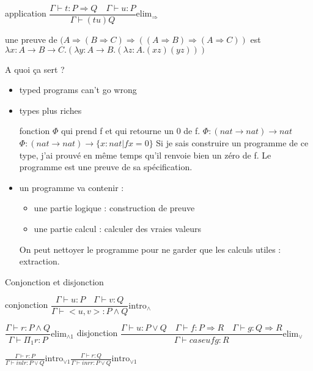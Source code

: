 \documentclass[10pt,a4paper]{article}
\begin{document}
application $\dfrac{\Gamma \vdash t : P \Rightarrow Q \quad \Gamma \vdash u:P}{\Gamma \vdash (t u) Q}\text{elim}_{\Rightarrow}$

\begin{ex}
 une preuve de $(A \Rightarrow (B \Rightarrow C) \Rightarrow (( A \Rightarrow B) \Rightarrow (A \Rightarrow C))$ est \\
$\lambda x : A → B → C . (\lambda y : A → B. ( \lambda z : A . (x z) (y z)))$
\end{ex}

A quoi ça sert ? 
\begin{itemize}
 \item \og typed programs can't go wrong \fg
 \item types plus riches \begin{ex}
                          fonction $\Phi$ qui prend f et qui retourne un 0 de f.
                          $\Phi: (nat → nat ) → nat$
                          $\Phi: (nat → nat ) → \{ x : nat | f x = 0 \}$ Si je sais construire un programme de ce type, j'ai prouvé en même temps qu'il renvoie bien un zéro de f.
                          Le programme est une preuve de sa spécification.
                         \end{ex}
 \item un programme va contenir : \begin{itemize}
                          \item une partie logique : construction de preuve
                          \item une partie calcul : calculer des \og vraies valeurs \fg
                         \end{itemize}
On peut nettoyer le programme pour ne garder que les calculs utiles : extraction.

\end{itemize}


Conjonction et disjonction

conjonction 
$\dfrac{\Gamma \vdash u:P  \quad \Gamma \vdash v:Q }{\Gamma \vdash <u,v> : P \wedge Q}\text{intro}_{\wedge}$

$\dfrac{\Gamma \vdash r : P \wedge Q}{\Gamma \vdash \Pi_1 r :P }\text{elim}_{\wedge 1}$
disjonction
$\dfrac{\Gamma \vdash u : P \vee Q \quad \Gamma \vdash f: P \Rightarrow R \quad \Gamma \vdash g : Q \Rightarrow R}{\Gamma \vdash case u f g : R}\text{elim}_{\vee}$

$\frac{\Gamma \vdash r: P}{\Gamma \vdash inl r : P \vee Q}\text{intro}_{\vee 1}
\frac{\Gamma \vdash r: Q}{\Gamma \vdash inr r : P \vee Q}\text{intro}_{\vee 1}$
\end{document}
